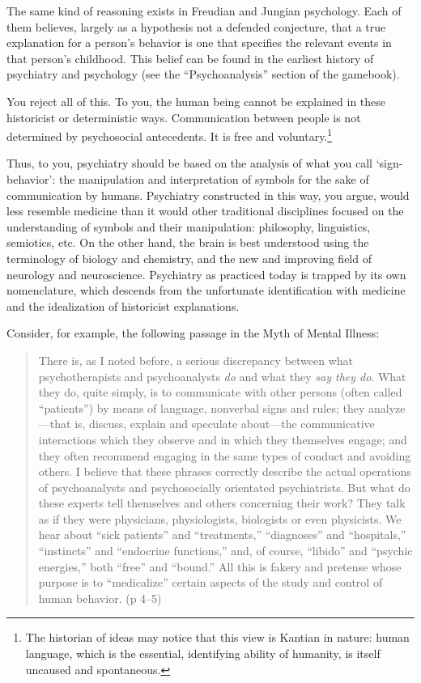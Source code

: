 \begin{refsection}
The same kind of reasoning exists in Freudian and Jungian psychology. Each of them believes, largely as a hypothesis not a defended conjecture, that a true explanation for a person’s behavior is one that specifies the relevant events in that person’s childhood. This belief can be found in the earliest history of psychiatry and psychology (see the “Psychoanalysis” section of the gamebook).

You reject all of this. To you, the human being cannot be explained in these historicist or deterministic ways. Communication between people is not determined by psychosocial antecedents. It is free and voluntary.\footnote{The historian of ideas may notice that this view is Kantian in nature: human language, which is the essential, identifying ability of humanity, is itself uncaused and spontaneous.}

Thus, to you, psychiatry should be based on the analysis of what you call ‘sign-behavior’: the manipulation and interpretation of symbols for the sake of communication by humans. Psychiatry constructed in this way, you argue, would less resemble medicine than it would other traditional disciplines focused on the understanding of symbols and their manipulation: philosophy, linguistics, semiotics, etc. On the other hand, the brain is best understood using the terminology of biology and chemistry, and the new and improving field of neurology and neuroscience. Psychiatry as practiced today is trapped by its own nomenclature, which descends from the unfortunate identification with medicine and the idealization of historicist explanations.

Consider, for example, the following passage in the Myth of Mental Illness:

\begin{quote}

There is, as I noted before, a serious discrepancy between what psychotherapists and psychoanalysts \emph{do} and what they \emph{say they do}. What they do, quite simply, is to communicate with other persons (often called “patients”) by means of language, nonverbal signs and rules; they analyze—that is, discuss, explain and speculate about—the communicative interactions which they observe and in which they themselves engage; and they often recommend engaging in the same types of conduct and avoiding others. I believe that these phrases correctly describe the actual operations of psychoanalysts and psychosocially orientated psychiatrists. But what do these experts tell themselves and others concerning their work? They talk as if they were physicians, physiologists, biologists or even physicists. We hear about “sick patients” and “treatments,” “diagnoses” and “hospitals,” “instincts” and “endocrine functions,” and, of course, “libido” and “psychic energies,” both “free” and “bound.” All this is fakery and pretense whose purpose is to “medicalize” certain aspects of the study and control of human behavior. (p 4--5)
\end{quote}


\end{refsection}
